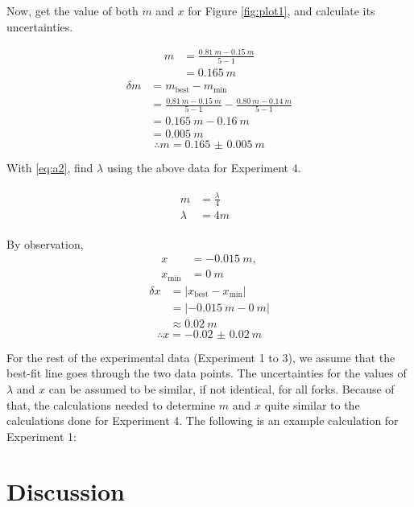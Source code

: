 \documentclass[letter]{article}
\numberwithin{equation}{section}
\begin{document}
Now, get the value of both \(m\) and \(x\) for Figure \ref{fig:plot1}, and calculate its uncertainties.

\begin{align*}
  m &= \frac{\SI{0.81}{m} - \SI{0.15}{m}}{5 - 1} \\
  &= \SI{0.165}{m}
\end{align*}
\begin{align*}
  \delta m &= m_{\mathrm{best}} - m_{\mathrm{min}} \\
  &= \frac{\SI{0.81}{m} - \SI{0.15}{m}}{5 - 1} - \frac{\SI{0.80}{m} - \SI{0.14}{m}}{5 - 1} \\
  &= \SI{0.165}{m} - \SI{0.16}{m} \\
  &= \SI{0.005}{m}
\end{align*}
\begin{equation*}
  \therefore m = \SI{0.165(5)}{m}
\end{equation*}

With \eqref{eq:a2}, find \(\lambda\) using the above data for Experiment 4.

\begin{align}
  \begin{split}
    m &= \frac{\lambda}{4} \\
    \lambda &= 4m
  \end{split}
  \begin{split}
    
  \end{split}
\end{align}

By observation,
\begin{align*}
  x &= \SI{-0.015}{m}, \\
  x_\mathrm{min} &= \SI{0}{m}
\end{align*}
\begin{align*}
  \delta x &= |x_{\mathrm{best}} - x_{\mathrm{min}}| \\
  &= |\SI{-0.015}{m} - \SI{0}{m}| \\
  &\approx \SI{0.02}{m}
\end{align*}
\begin{equation*}
  \therefore x = \SI{-0.02(2)}{m}
\end{equation*}

For the rest of the experimental data (Experiment 1 to 3), we assume that the best-fit line goes through the two data points. The uncertainties for the values of \(\lambda\) and \(x\) can be assumed to be similar, if not identical, for all forks. Because of that, the calculations needed to determine \(m\) and \(x\) quite similar to the calculations done for Experiment 4. The following is an example calculation for Experiment 1:


\section{Discussion}
\end{document}

